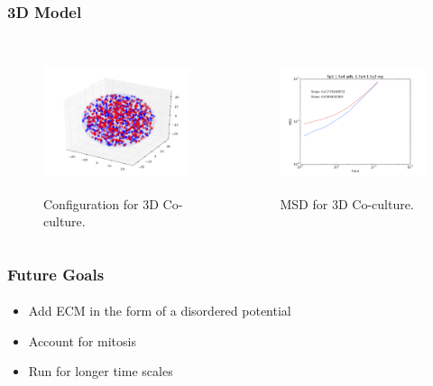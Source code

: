 \documentclass{beamer}
\begin{document}
  \begin{frame}
    \frametitle{3D Model}
    \framesubtitle{}
  	\begin{columns}[t] 
  	\begin{figure}
  	  \includegraphics[height=1.6in]{3dconf.png}
      \caption{Configuration for 3D Co-culture.}
  	\end{figure}
    \begin{figure}
      \includegraphics[height=1.6in]{3dmsd.png}
      \caption{MSD for 3D Co-culture.}
    \end{figure}
    \end{columns}
    \vfill
  \end{frame}
  
  \begin{frame}
    \frametitle{Future Goals}
    \framesubtitle{}
    \begin{itemize}
    \item Add ECM in the form of a disordered potential
    \item Account for mitosis
    \item Run for longer time scales
    \end{itemize}
    \vfill
  \end{frame}
  
    
\end{document}
